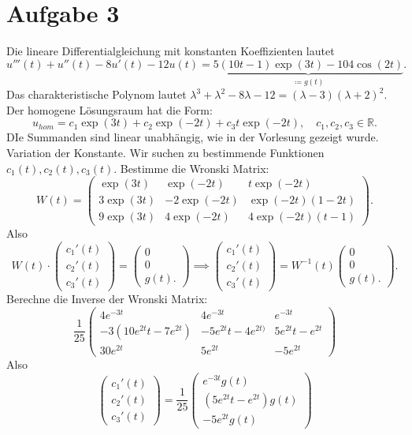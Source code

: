 \documentclass[9pt]{extarticle}
\theoremstyle{named}
\begin{document}
\section*{Aufgabe 3}
Die lineare Differentialgleichung mit konstanten Koeffizienten lautet
\[
	u'''(t)+u''(t)-8u'(t)-12u(t) = \underbrace{5(10t-1)\exp(3t) - 104 \cos(2t)}_{\coloneqq g(t)}.
\]
Das charakteristische Polynom lautet $\lambda^3+\lambda^2-8\lambda-12 = (\lambda-3)(\lambda+2)^2$. Der homogene Lösungsraum hat die Form:
\[
	u_{hom} = c_1\exp(3t) +c_2\exp(-2t) + c_3t\exp(-2t), \quad c_1,c_2,c_3 \in \mathbb R.
\]
DIe Summanden sind linear unabhängig, wie in der Vorlesung gezeigt wurde. Variation der Konstante. Wir suchen zu bestimmende Funktionen $c_1(t), c_2(t), c_3(t)$. Bestimme die Wronski Matrix:
\[
	W(t) = \begin{pmatrix}
		\exp(3t) & \exp(-2t) & t\exp(-2t) \\
		3\exp(3t) & -2\exp(-2t) & \exp(-2t)(1-2t) \\
		9 \exp(3t) & 4\exp(-2t) & 4\exp(-2t)(t-1)
	\end{pmatrix}.
\]
Also 
\[
	W(t) \cdot \begin{pmatrix}
		c_1'(t) \\ c_2'(t) \\ c_3'(t)
	\end{pmatrix} = \begin{pmatrix}
		0 \\ 0 \\
		g(t).
	\end{pmatrix} \implies  \begin{pmatrix}
	c_1'(t) \\ c_2'(t) \\ c_3'(t)
	\end{pmatrix} = W^{-1}(t) \begin{pmatrix}
	0 \\ 0 \\
	g(t).
	\end{pmatrix}.
\]
Berechne die Inverse der Wronski Matrix:
\[
	\frac{1}{25}
	\begin{pmatrix}
		4 e^{-3 t} & 4 e^{-3 t} & e^{-3 t} \\
		-3 (10 e^{2 t} t - 7 e^{2 t}) & -5 e^{2 t} t - 4 e^{2 t)} & 5 e^{2 t} t - e^{2 t} \\
		30 e^{2 t} & 5 e^{2 t} & -5 e^{2 t}
	\end{pmatrix}
\]
Also
\[
	\begin{pmatrix}
	c_1'(t) \\ c_2'(t) \\ c_3'(t)
	\end{pmatrix} = \frac{1}{25}
	\begin{pmatrix}
		e^{-3t}g(t) \\ (5e^{2t}t-e^{2t})g(t) \\ -5e^{2t}g(t)
	\end{pmatrix}
\]
\end{document}
